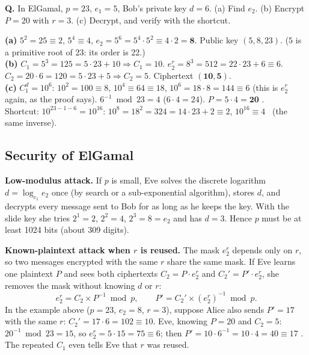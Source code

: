 \begin{worked}
\textbf{Q.} In ElGamal, $p = 23$, $e_1 = 5$, Bob's private key $d = 6$. (a) Find $e_2$. (b) Encrypt $P = 20$ with $r = 3$. (c) Decrypt, and verify with the shortcut.

\textbf{(a)} $5^2 = 25 \equiv 2$, $5^4 \equiv 4$, $e_2 = 5^6 = 5^4 \cdot 5^2 \equiv 4 \cdot 2 = \mathbf{8}$. Public key $(5, 8, 23)$. ($5$ is a primitive root of 23: its order is 22.)\\
\textbf{(b)} $C_1 = 5^3 = 125 = 5 \cdot 23 + 10 \Rightarrow C_1 = 10$. \;$e_2^r = 8^3 = 512 = 22 \cdot 23 + 6 \equiv 6$. \;$C_2 = 20 \cdot 6 = 120 = 5 \cdot 23 + 5 \Rightarrow C_2 = 5$. Ciphertext $\mathbf{(10, 5)}$.\\
\textbf{(c)} $C_1^d = 10^6$: $10^2 = 100 \equiv 8$, $10^4 \equiv 64 \equiv 18$, $10^6 = 18 \cdot 8 = 144 \equiv 6$ (this is $e_2^r$ again, as the proof says). $6^{-1} \bmod 23 = 4$ ($6 \cdot 4 = 24$). \;$P = 5 \cdot 4 = \mathbf{20}$ \checkmark.\\
Shortcut: $10^{23-1-6} = 10^{16}$: $10^8 = 18^2 = 324 = 14 \cdot 23 + 2 \equiv 2$, $10^{16} \equiv 4$ \checkmark\ (the same inverse).
\end{worked}

\subsection{Security of ElGamal \new}

\textbf{Low-modulus attack.} If $p$ is small, Eve solves the discrete logarithm $d = \log_{e_1} e_2$ once (by search or a sub-exponential algorithm), stores $d$, and decrypts every message sent to Bob for as long as he keeps the key. With the slide key she tries $2^1 = 2$, $2^2 = 4$, $2^3 = 8 = e_2$ and has $d = 3$. Hence $p$ must be at least 1024 bits (about 309 digits).

\textbf{Known-plaintext attack when $r$ is reused.} The mask $e_2^r$ depends only on $r$, so two messages encrypted with the same $r$ share the same mask. If Eve learns one plaintext $P$ and sees both ciphertexts $C_2 = P \cdot e_2^r$ and $C_2' = P' \cdot e_2^r$, she removes the mask without knowing $d$ or $r$:
\[
e_2^r = C_2 \times P^{-1} \bmod p, \qquad P' = C_2' \times (e_2^r)^{-1} \bmod p.
\]
In the example above ($p = 23$, $e_2 = 8$, $r = 3$), suppose Alice also sends $P' = 17$ with the same $r$: $C_2' = 17 \cdot 6 = 102 \equiv 10$. Eve, knowing $P = 20$ and $C_2 = 5$: $20^{-1} \bmod 23 = 15$, so $e_2^r = 5 \cdot 15 = 75 \equiv 6$; then $P' = 10 \cdot 6^{-1} = 10 \cdot 4 = 40 \equiv 17$ \checkmark. The repeated $C_1$ even tells Eve that $r$ was reused. 


